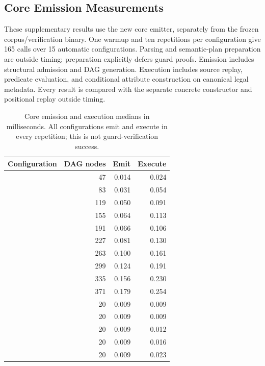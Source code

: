 \subsection{Core Emission Measurements}
\label{app:core-emission-results}
These supplementary results use the new core emitter, separately from the frozen corpus/verification binary. One warmup and ten repetitions per configuration give 165 calls over 15 automatic configurations. Parsing and semantic-plan preparation are outside timing; preparation explicitly defers guard proofs. Emission includes structural admission and DAG generation. Execution includes source replay, predicate evaluation, and conditional attribute construction on canonical legal metadata. Every result is compared with the separate concrete constructor and positional replay outside timing.
\begin{table}[!htbp]
\caption{Core emission and execution medians in milliseconds. All configurations emit and execute in every repetition; this is not guard-verification success.}
\label{tab:core-emission-cost}
\small
\begin{tabularx}{\linewidth}{@{}Yrrr@{}}\toprule
Configuration & DAG nodes & Emit & Execute\\\midrule
{} & 47 & 0.014 & 0.024\\
 & 83 & 0.031 & 0.054\\
 & 119 & 0.050 & 0.091\\
 & 155 & 0.064 & 0.113\\
 & 191 & 0.066 & 0.106\\
 & 227 & 0.081 & 0.130\\
 & 263 & 0.100 & 0.161\\
 & 299 & 0.124 & 0.191\\
 & 335 & 0.156 & 0.230\\
 & 371 & 0.179 & 0.254\\
 & 20 & 0.009 & 0.009\\
 & 20 & 0.009 & 0.009\\
 & 20 & 0.009 & 0.012\\
 & 20 & 0.009 & 0.016\\
 & 20 & 0.009 & 0.023\\
\bottomrule\end{tabularx}
\end{table}
